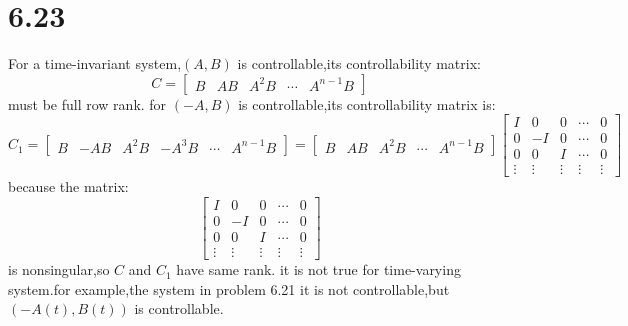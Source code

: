 \documentclass{article}
\begin{document}
\section*{6.23}
For a time-invariant system,$(A,B)$ is controllable,its controllability matrix:\\
\[
C=
\left[
\begin{array}{ccccc}
B & AB & A^2B & \cdots & A^{n-1}B
\end{array}
\right]   
\]
must be full row rank.
for $(-A,B)$ is controllable,its controllability matrix is:
\[
C_1=
\left[
\begin{array}{cccccc}
B & -AB & A^2B & -A^3B & \cdots & A^{n-1}B
\end{array}
\right]=
\left[
\begin{array}{ccccc}
B & AB & A^2B & \cdots & A^{n-1}B
\end{array}
\right]
\left[
    \begin{array}{ccccc}
        I & 0 & 0 &\cdots & 0\\
        0 & -I & 0 & \cdots & 0\\
        0 & 0 & I & \cdots & 0\\
        \vdots & \vdots & \vdots & \vdots & \vdots
    \end{array}
\right]  
\]
because the matrix:
\[
    \left[
        \begin{array}{ccccc}
            I & 0 & 0 &\cdots & 0\\
            0 & -I & 0 & \cdots & 0\\
            0 & 0 & I & \cdots & 0\\
            \vdots & \vdots & \vdots & \vdots & \vdots
        \end{array}
    \right]     
\]
is nonsingular,so $C$ and $C_1$  have same rank.
it is not true for time-varying system.for example,the system in problem 6.21 it is not controllable,but $(-A(t),B(t))$ is controllable.
\end{document}
